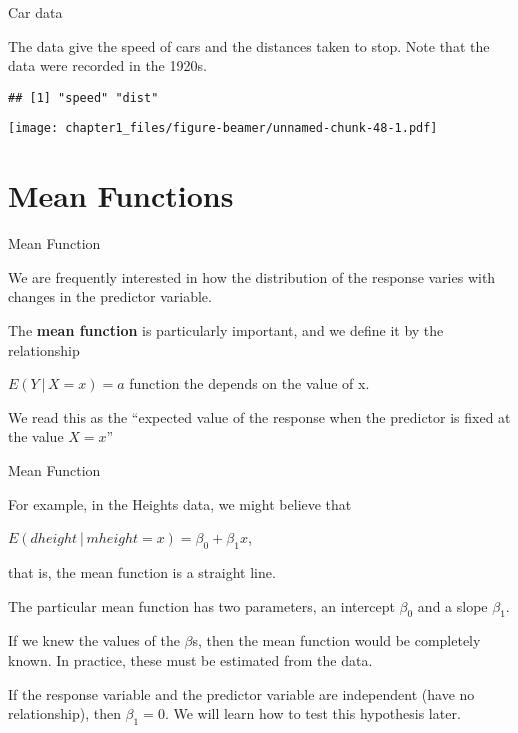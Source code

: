 \begin{frame}[fragile]{Car data}
\protect\hypertarget{car-data}{}

The data give the speed of cars and the distances taken to stop. Note
that the data were recorded in the 1920s.

\begin{verbatim}
## [1] "speed" "dist"
\end{verbatim}

\texttt{[image: chapter1\_files/figure-beamer/unnamed-chunk-48-1.pdf]}

\end{frame}

\hypertarget{mean-functions}{%
\section{Mean Functions}\label{mean-functions}}

\begin{frame}{Mean Function}
\protect\hypertarget{mean-function}{}

We are frequently interested in how the distribution of the response
varies with changes in the predictor variable.

The \textbf{mean function} is particularly important, and we define it
by the relationship

\(E(Y│X=x)=a\) function the depends on the value of x.

We read this as the ``expected value of the response when the predictor
is fixed at the value \(X=x\)''

\end{frame}

\begin{frame}{Mean Function}
\protect\hypertarget{mean-function-1}{}

For example, in the Heights data, we might believe that

\(E(dheight│mheight=x)=β_0+β_1 x\),

that is, the mean function is a straight line.

The particular mean function has two parameters, an intercept
\(\beta_0\) and a slope \(\beta_1\).

If we knew the values of the \(\beta\)s, then the mean function would be
completely known. In practice, these must be estimated from the data.

If the response variable and the predictor variable are independent
(have no relationship), then \(\beta_1=0\). We will learn how to test
this hypothesis later.

\end{frame}
